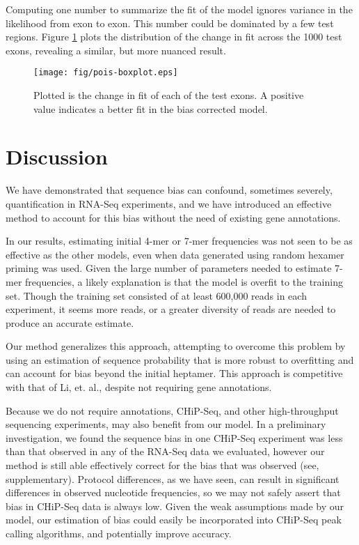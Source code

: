 \documentclass{bioinfo}
\begin{document}
Computing one number to summarize the fit of the model ignores variance in the
likelihood from exon to exon. This number could be dominated by a few test
regions. Figure \ref{fig:pois} plots the distribution of the change in fit
across the 1000 test exons, revealing a similar, but more nuanced result.

\begin{figure}
\centerline{\texttt{[image: fig/pois-boxplot.eps]}}
\caption{Plotted is the change in fit of each of the test exons. A
positive value indicates a better fit in the bias corrected model.}
\label{fig:pois}
\end{figure}


\section{Discussion}

We have demonstrated that sequence bias can confound, sometimes severely,
quantification in RNA-Seq experiments, and we have introduced an effective
method to account for this bias without the need of existing gene annotations.

In our results, estimating initial 4-mer or 7-mer frequencies was not seen to be
as effective as the other models, even when data generated using random hexamer
priming was used. Given the large number of parameters needed to estimate 7-mer
frequencies, a likely explanation is that the model is overfit to the training
set. Though the training set consisted of at least 600,000 reads in
each experiment, it seems more reads, or a greater diversity of reads are needed
to produce an accurate estimate.

Our method generalizes this approach, attempting to overcome this problem by
using an estimation of sequence probability that is more robust to overfitting
and can account for bias beyond the initial heptamer. This approach is
competitive with that of Li, et. al., despite not requiring gene annotations.

Because we do not require annotations, CHiP-Seq, and other high-throughput
sequencing experiments, may also benefit from our model. In a preliminary
investigation, we found the sequence bias in one CHiP-Seq experiment
\cite{Cao2010} was less than that observed in any of the RNA-Seq data we
evaluated, however our method is still able effectively correct for the bias
that was observed (see, supplementary). Protocol differences, as we have seen,
can result in significant differences in observed nucleotide frequencies, so we
may not safely assert that bias in CHiP-Seq data is always low.  Given the weak
assumptions made by our model, our estimation of bias could easily be
incorporated into CHiP-Seq peak calling algorithms, and potentially improve
accuracy.
\end{document}
